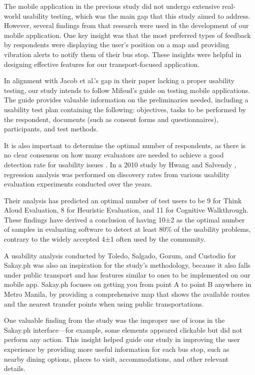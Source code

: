 \documentclass[journal]{./IEEE/IEEEtran}
\begin{document}
The mobile application in the previous study did not undergo extensive real-world usability testing, which was the main gap that this study aimed to address. However, several findings from that research were used in the development of our mobile application. One key insight was that the most preferred types of feedback by respondents were displaying the user’s position on a map and providing vibration alerts to notify them of their bus stop. These insights were helpful in designing effective features for our transport-focused application.

In alignment with Jacob et al.’s gap in their paper lacking a proper usability testing, our study intends to follow Mifsud’s guide \cite{Ref:013} on testing mobile applications. The guide provides valuable information on the preliminaries needed, including a usability test plan containing the following: objectives, tasks to be performed by the respondent, documents (such as consent forms and questionnaires), participants, and test methods.

It is also important to determine the optimal number of respondents, as there is no clear consensus on how many evaluators are needed to achieve a good detection rate for usability issues \cite{Ref:007}. In a 2010 study by Hwang and Salvendy \cite{Ref:007}, regression analysis was performed on discovery rates from various usability evaluation experiments conducted over the years.

Their analysis has predicted an optimal number of test users to be 9 for Think Aloud Evaluation, 8 for Heuristic Evaluation, and 11 for Cognitive Walkthrough. These findings have derived a conclusion of having 10±2 as the optimal number of samples in evaluating software to detect at least 80\% of the usability problems, contrary to the widely accepted 4±1 often used by the community.

A usability analysis conducted by Toledo, Salgado, Gozum, and Custodio \cite{Ref:018} for Sakay.ph was also an inspiration for the study’s methodology, because it also falls under public transport and has features similar to ones to be implemented on our mobile app. Sakay.ph focuses on getting you from point A to point B anywhere in Metro Manila, by providing a comprehensive map that shows the available routes and the nearest transfer points when using public transportations.

One valuable finding from the study was the improper use of icons in the Sakay.ph interface—for example, some elements appeared clickable but did not perform any action. This insight helped guide our study in improving the user experience by providing more useful information for each bus stop, such as nearby dining options, places to visit, accommodations, and other relevant details.
\end{document}
